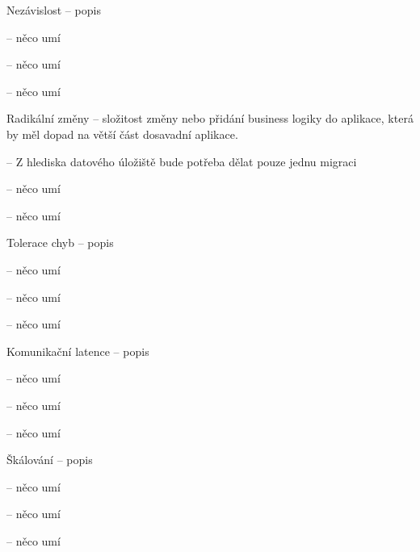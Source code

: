 \begin{dl}
   \item[Nezávislost] – popis
\end{dl}
\begin{ul}
   \item {} – něco umí
   \item {} – něco umí
   \item {} – něco umí
\end{ul}

\begin{dl}
   \item[Radikální změny] – složitost změny nebo přidání business logiky do aplikace, která by měl dopad na větší část dosavadní aplikace.
\end{dl}
\begin{ul}
   \item {} –
   Z hlediska datového úložiště bude potřeba dělat pouze jednu migraci
   \item {} – něco umí
   \item {} – něco umí
\end{ul}

\begin{dl}
   \item[Tolerace chyb] – popis
\end{dl}
\begin{ul}
   \item {} – něco umí
   \item {} – něco umí
   \item {} – něco umí
\end{ul}

\begin{dl}
   \item[Komunikační latence] – popis
\end{dl}
\begin{ul}
   \item {} – něco umí
   \item {} – něco umí
   \item {} – něco umí
\end{ul}

\begin{dl}
   \item[Škálování] – popis
\end{dl}
\begin{ul}
   \item {} – něco umí
   \item {} – něco umí
   \item {} – něco umí
\end{ul}

